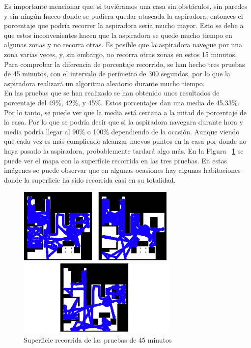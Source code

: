 Es importante mencionar que, si tuviéramos una casa sin obstáculos, sin paredes y sin ningún hueco donde se pudiera quedar atascada la aspiradora, entonces el porcentaje que podría recorrer la aspiradora sería mucho mayor. Esto se debe a que estos inconvenientes hacen que la aspiradora se quede mucho tiempo en algunas zonas y no recorra otras. Es posible que la aspiradora navegue por una zona varias veces, y, sin embargo, no recorra otras zonas en estos 15 minutos.\\

Para comprobar la diferencia de porcentaje recorrido, se han hecho tres pruebas de 45 minutos, con el intervalo de perímetro de 300 segundos, por lo que la aspiradora realizará un algoritmo aleatorio durante mucho tiempo. \\

En las pruebas que se han realizado se han obtenido unos resultados de porcentaje del 49\%, 42\%, y 45\%. Estos porcentajes dan una media de 45.33\%. Por lo tanto, se puede ver que la media está cercana a la mitad de porcentaje de la casa. Por lo que se podría decir que si la aspiradora navegara durante hora y media podría llegar al 90\% o 100\% dependiendo de la ocasión. Aunque viendo que cada vez es más complicado alcanzar nuevos puntos en la casa por donde no haya pasado la aspiradora, probablemente tardará algo más. En la Figura ~\ref{fig.Referee_45MIN} se puede ver el mapa con la superficie recorrida en las tres pruebas. En estas imágenes se puede observar que en algunas ocasiones hay algunas habitaciones donde la superficie ha sido recorrida casi en su totalidad.\\

\begin{figure}[H]
  \begin{center}
    \includegraphics[width=0.7\textwidth]{figures/Vacuum/Referee_45MIN.png}
		\caption{Superficie recorrida de las pruebas de 45 minutos}
		\label{fig.Referee_45MIN}
		\end{center}
\end{figure}